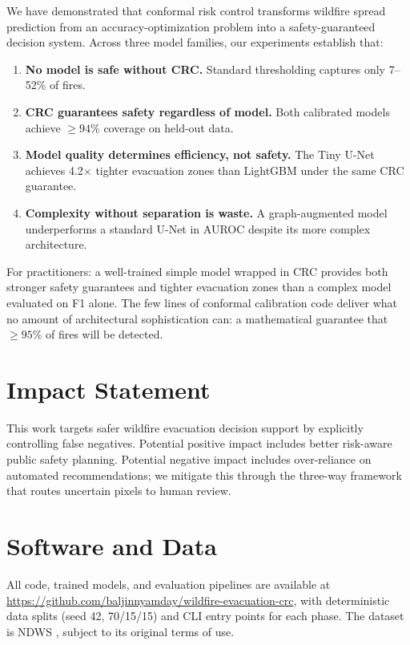 \documentclass{article}
\begin{document}
We have demonstrated that conformal risk control transforms wildfire spread prediction from an accuracy-optimization problem into a safety-guaranteed decision system.
Across three model families, our experiments establish that:
\begin{enumerate}
\item \textbf{No model is safe without CRC.}  Standard thresholding captures only 7--52\% of fires.
\item \textbf{CRC guarantees safety regardless of model.}  Both calibrated models achieve ${\ge}94\%$ coverage on held-out data.
\item \textbf{Model quality determines efficiency, not safety.}  The Tiny U-Net achieves 4.2$\times$ tighter evacuation zones than LightGBM under the same CRC guarantee.
\item \textbf{Complexity without separation is waste.}  A graph-augmented model underperforms a standard U-Net in AUROC despite its more complex architecture.
\end{enumerate}

For practitioners: a well-trained simple model wrapped in CRC provides both stronger safety guarantees and tighter evacuation zones than a complex model evaluated on F1 alone.
The few lines of conformal calibration code deliver what no amount of architectural sophistication can: a mathematical guarantee that ${\ge}95\%$ of fires will be detected.

\section*{Impact Statement}
This work targets safer wildfire evacuation decision support by explicitly controlling false negatives.
Potential positive impact includes better risk-aware public safety planning.
Potential negative impact includes over-reliance on automated recommendations; we mitigate this through the three-way framework that routes uncertain pixels to human review.

\section*{Software and Data}
All code, trained models, and evaluation pipelines are available at \url{https://github.com/baljinnyamday/wildfire-evacuation-crc}, with deterministic data splits (seed 42, 70/15/15) and CLI entry points for each phase.
The dataset is NDWS \citep{ndwsdataset}, subject to its original terms of use.
\end{document}
